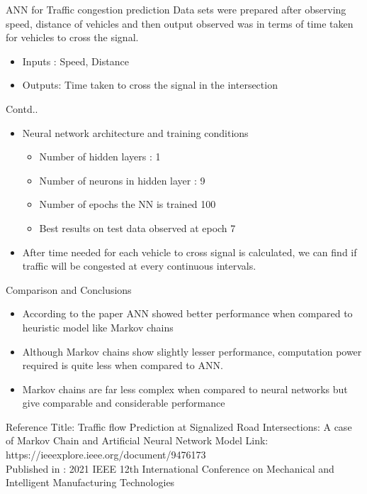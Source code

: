 \documentclass[10pt]{beamer}
\begin{document}
\begin{frame}{ANN for Traffic congestion prediction}
Data sets were prepared after observing speed, distance of vehicles 
and then output observed was in terms of time taken for vehicles to cross the signal.
\begin{itemize}
    \item Inputs : Speed, Distance
    \item Outputs: Time taken to cross the signal in the intersection
\end{itemize}
\end{frame}

\begin{frame}{Contd..}
\begin{itemize}
    \item Neural network architecture and training conditions
    \begin{itemize}
    \item Number of hidden layers : 1
    \item Number of neurons in hidden layer : 9
    \item Number of epochs the NN is trained 100
    \item Best results on test data observed at epoch 7
    \end{itemize}
    \item After time needed for each vehicle to cross signal is calculated, we can find if traffic will be congested at every continuous intervals.
\end{itemize}
\end{frame}

\begin{frame}{Comparison and Conclusions}
\begin{itemize}
    \item According to the paper ANN showed better performance when compared to heuristic model like Markov chains
    \item Although Markov chains show slightly lesser performance, computation power required is quite less when compared to ANN.
    \item Markov chains are far less complex when compared to neural networks but give comparable and considerable performance
    
\end{itemize}

\end{frame}

\begin{frame}{Reference}
    Title: Traffic flow Prediction at Signalized Road Intersections: 
    A case of Markov Chain and Artificial Neural Network Model
    Link: https://ieeexplore.ieee.org/document/9476173 \\
    Published in : 2021 IEEE 12th International Conference on Mechanical and Intelligent Manufacturing Technologies
    
\end{frame}
\end{document}
